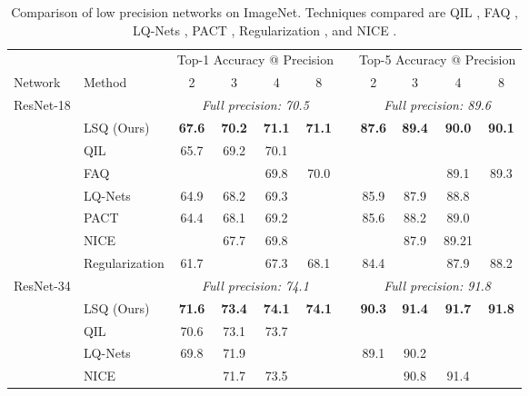 \documentclass{article}
\newcommand{\tb}{\textbf} %
\begin{document}
\begin{table}[bt]
	\caption{Comparison of low precision networks on ImageNet.
	Techniques compared are QIL \citep{jung2018joint}, FAQ \citep{mckinstry2018discovering}, LQ-Nets \citep{zhang2018lq}, PACT \citep{choi2018pact},  Regularization \citep{choi2018learning}, and NICE \citep{baskin2018nice}.
	}
	\label{table:top1}
	\setlength\tabcolsep{6pt}
	\begin{center}
	\small
	\begin{tabular}{l l cccc c cccc}
		\toprule
		& & \multicolumn{4}{c}{Top-1 Accuracy @ Precision} & & \multicolumn{4}{c}{Top-5 Accuracy @ Precision} \\
		Network & Method & 2 & 3 & 4 & 8 & & 2 & 3 & 4 & 8 \\
		\midrule
		ResNet-18 	& & \multicolumn{4}{c}{{\textit{Full precision: 70.5}}} & & \multicolumn{4}{c}{{\textit{Full precision: 89.6}}} \\
					&	LSQ (Ours) 	 	& \tb{67.6}	& \tb{70.2}& \tb{71.1}& \tb{71.1}& 	& \tb{87.6}	& \tb{89.4}	& \tb{90.0}	& \tb{90.1} \\
					& 	QIL 				& 65.7 	& 69.2 	& 70.1 	& 		& 	&  \\
					&	FAQ				&		& 		& 69.8	& 70.0	& 	& 		&		& 89.1	& 89.3 \\			
					& 	LQ-Nets 			& 64.9	& 68.2 	& 69.3 	&  		&	& 85.9 	& 87.9	& 88.8	& \\		
					&	PACT 			& 64.4	& 68.1 	& 69.2 	&  		&	& 85.6	& 88.2	& 89.0	& \\
					&	NICE			& 		& 67.7	& 69.8	&		&	& 		& 87.9	& 89.21	& \\			
					& 	Regularization		& 61.7	& 		& 67.3	& 68.1	&	& 84.4	&		& 87.9	& 88.2 \\	
		\midrule
		ResNet-34	& & \multicolumn{4}{c}{{\textit{Full precision: 74.1}}} & & \multicolumn{4}{c}{{\textit{Full precision: 91.8}}} \\
					&	LSQ (Ours) 	 	& \tb{71.6}& \tb{73.4} & \tb{74.1}& \tb{74.1}& 	& \tb{90.3}	& \tb{91.4}	& \tb{91.7}	&\tb{91.8} \\
					& 	QIL 				& 70.6 	& 73.1 	& 73.7 	& 		& 	&  \\					
					&	LQ-Nets			& 69.8	& 71.9	&		&		& 	& 89.1	& 90.2	&		& \\
					&	NICE			& 		& 71.7	& 73.5	&		&	& 		& 90.8	& 91.4	& \\

\end{tabular}
\end{center}
\end{table}
\end{document}
